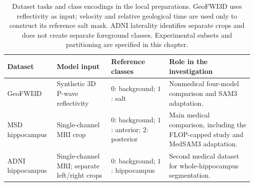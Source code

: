 \documentclass[12pt,a4paper]{article}
\begin{document}
\begin{table}[htbp]
\centering
\small
{}
\renewcommand{\arraystretch}{1.2}
\begin{tabular}{P{2.65cm}P{3.15cm}P{3.65cm}P{4.1cm}}
\hline
Dataset & Model input & Reference classes & Role in the investigation \\
\hline
GeoFWI3D & Synthetic 3D P-wave reflectivity &
$0$: background; $1$: salt &
Nonmedical four-model comparison and SAM3 adaptation. \\[0.4em]
MSD hippocampus & Single-channel MRI crop &
$0$: background; $1$: anterior; $2$: posterior &
Main medical comparison, including the FLOP-capped study and MedSAM3 adaptation. \\[0.4em]
ADNI hippocampus & Single-channel MRI; separate left/right crops &
$0$: background; $1$: hippocampus &
Second medical dataset for whole-hippocampus segmentation. \\
\hline
\end{tabular}
\caption{Dataset tasks and class encodings in the local preparations.
GeoFWI3D uses reflectivity as input; velocity and relative geological time
are used only to construct its reference salt mask. ADNI laterality
identifies separate crops and does not create separate foreground classes.
Experimental subsets and partitioning are specified in this chapter.}
\label{tab:dataset-task-overview}
\end{table}
\end{document}
